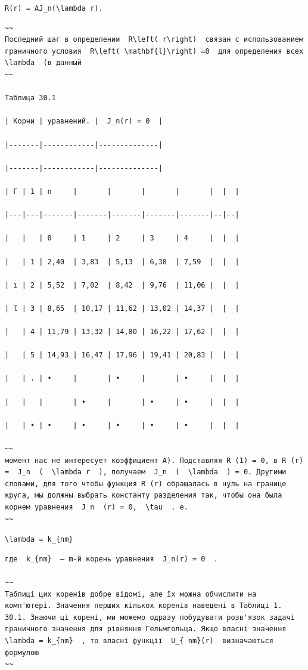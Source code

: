 \documentclass[
  ukrainian,
]{article}
\begin{document}
\texttt{R(r)\ =\ AJ\_n(\textbackslash{}lambda\ r).}

\begin{verbatim}
~~
Последний шаг в определении  R\left( r\right)  связан с использованием граничного условия  R\left( \mathbf{l}\right) =0  для определения всех  \lambda  (в данный
~~

Таблица 30.1

| Корни | уравнений. |  J_n(r) = 0  |

|-------|------------|--------------|

|-------|------------|--------------|

| Γ | 1 | n     |       |       |       |       |  |  |

|---|---|-------|-------|-------|-------|-------|--|--|

|   |   | 0     | 1     | 2     | 3     | 4     |  |  |

|   | 1 | 2,40  | 3,83  | 5,13  | 6,38  | 7,59  |  |  |

| ı | 2 | 5,52  | 7,02  | 8,42  | 9,76  | 11,06 |  |  |

| ľ | 3 | 8,65  | 10,17 | 11,62 | 13,02 | 14,37 |  |  |

|   | 4 | 11,79 | 13,32 | 14,80 | 16,22 | 17,62 |  |  |

|   | 5 | 14,93 | 16,47 | 17,96 | 19,41 | 20,83 |  |  |

|   | . | •     |       | •     |       | •     |  |  |

|   |   |       | •     |       | •     | •     |  |  |

|   | • | •     | •     | •     | •     | •     |  |  |

~~
момент нас не интересует коэффициент A). Подставляя R (1) = 0, в R (r) =  J_n  (  \lambda r  ), получаем  J_n  (  \lambda  ) = 0. Другими словами, для того чтобы функция R (r) обращалась в нуль на границе круга, мы должны выбрать константу разделения так, чтобы она была корнем уравнения  J_n  (r) = 0,  \tau  . e.
~~
\end{verbatim}

\texttt{\textbackslash{}lambda\ =\ k\_\{nm\}}

\begin{verbatim}
где  k_{nm}  — m-й корень уравнения  J_n(r) = 0  .

~~
Таблиці цих коренів добре відомі, але їх можна обчислити на комп'ютері. Значення перших кількох коренів наведені в Таблиці 1. 30.1. Знаючи ці корені, ми можемо одразу побудувати розв'язок задачі граничного значення для рівняння Гельмгольца. Якщо власні значення  \lambda = k_{nm}  , то власні функції  U_{ nm}(r)  визначаються формулою
~~
\end{verbatim}
\end{document}
